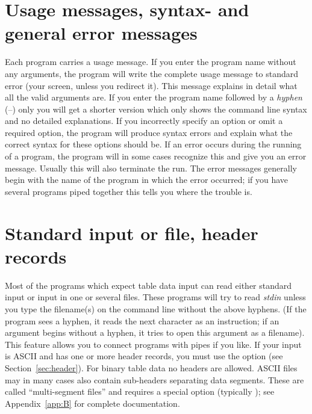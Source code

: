 \section{Usage messages, syntax- and general error messages}

Each program carries a usage message.  If you enter the program
name without any arguments, the program will write the complete
usage message to standard error (your screen, unless you
redirect it).  This message explains in detail what all the
valid arguments are.  If you enter the program name followed
by a \emph{hyphen} (--) only you will get a shorter version
which only shows the command line syntax and no detailed
explanations.  If you incorrectly specify an option or omit
a required option, the program will produce syntax errors and
explain what the correct syntax for these options should be.
If an error occurs during the running of a program, the
program will in some cases recognize this and give you an
error message.  Usually this will also terminate the run.
The error messages generally begin with the name of the
program in which the error occurred; if you have several
programs piped together this tells you where the trouble is. 

\section{Standard input or file, header records}

Most of the programs which expect table data input can read
either standard input or input in one or several files.
These programs will try to read \emph{stdin} unless you type
the filename(s) on the command line without the above hyphens.
(If the program sees a hyphen, it reads the next character
as an instruction; if an argument begins without a hyphen,
it tries to open this argument as a filename).
This feature allows you to connect programs with pipes if
you like.  If your input is ASCII and has one or more header
records, you must use the  option (see Section~\ref{sec:header}).
For binary table data no headers are allowed.
ASCII files may in many cases also contain sub-headers
separating data segments.  These are called ``multi-segment files''
and requires a special option (typically ); see Appendix~\ref{app:B} for complete
documentation. 


